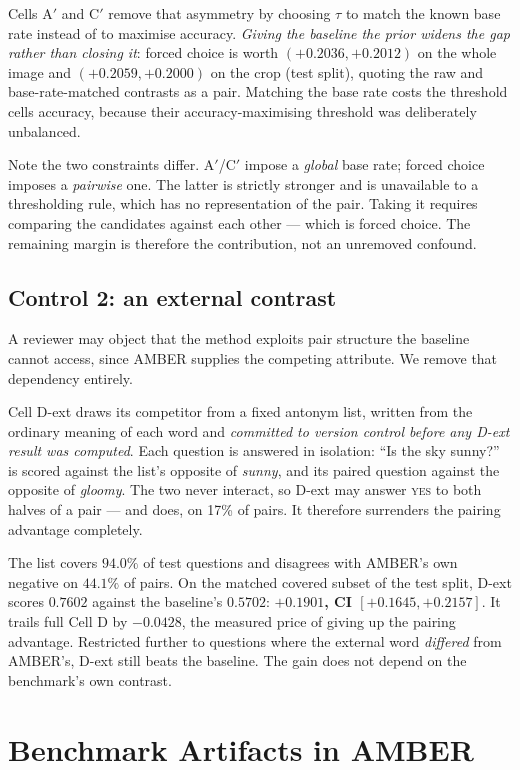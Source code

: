 \documentclass[conference]{IEEEtran}
\begin{document}
Cells A$'$ and C$'$ remove that asymmetry by choosing $\tau$ to match the known
base rate instead of to maximise accuracy. \emph{Giving the baseline the prior
widens the gap rather than closing it}: forced choice is worth
$(+0.2036, +0.2012)$ on the whole image and $(+0.2059, +0.2000)$ on the crop
(test split), quoting the raw and base-rate-matched contrasts as a pair. Matching the base rate
costs the threshold cells accuracy, because their accuracy-maximising threshold
was deliberately unbalanced.

Note the two constraints differ. A$'$/C$'$ impose a \emph{global} base rate;
forced choice imposes a \emph{pairwise} one. The latter is strictly stronger and
is unavailable to a thresholding rule, which has no representation of the pair.
Taking it requires comparing the candidates against each other --- which is
forced choice. The remaining margin is therefore the contribution, not an
unremoved confound.

\subsection{Control 2: an external contrast}

A reviewer may object that the method exploits pair structure the baseline cannot
access, since AMBER supplies the competing attribute. We remove that dependency
entirely.

Cell D-ext draws its competitor from a fixed antonym list, written from the
ordinary meaning of each word and \emph{committed to version control before any
D-ext result was computed}. Each question is answered in isolation: ``Is the sky
sunny?'' is scored against the list's opposite of \emph{sunny}, and its paired
question against the opposite of \emph{gloomy}. The two never interact, so D-ext
may answer \textsc{yes} to both halves of a pair --- and does, on 17\% of pairs.
It therefore surrenders the pairing advantage completely.

The list covers $94.0\%$ of test questions and disagrees with AMBER's own
negative on $44.1\%$ of pairs. On the matched covered subset of the test split,
D-ext scores $0.7602$ against the baseline's $0.5702$: \textbf{$+0.1901$, CI
$[+0.1645, +0.2157]$}. It trails full Cell D by $-0.0428$, the measured price of
giving up the pairing advantage. Restricted further to questions where the external word \emph{differed}
from AMBER's, D-ext still beats the baseline. The gain does not depend on the
benchmark's own contrast.

\section{Benchmark Artifacts in AMBER}
\end{document}
